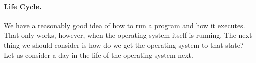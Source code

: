 \paragraph{Life Cycle.}
We have a reasonably good idea of how to run a program and how it executes. That only works, however, when the operating system itself is running. The next thing we should consider is how do we get the operating system to that state? Let us consider a day in the life of the operating system next.




